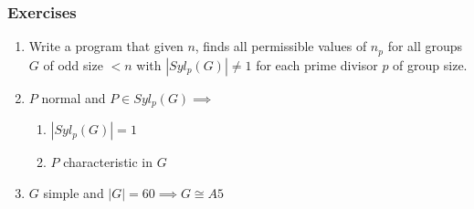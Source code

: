 \documentclass{beamer}
\begin{document}
\begin{frame}
    \frametitle{Exercises}
    \begin{enumerate}
    \item Write a program that given $n$, finds all permissible values of $n_p$
        for all groups $G$ of odd size $< n$ with $|Syl_p(G)|\neq 1$ for each
        prime divisor $p$ of group size.
        \item $P$ normal and $P\in Syl_p(G)\implies$
        \begin{enumerate}
            \item $|Syl_p(G)| = 1$
            \item $P$ characteristic in $G$
        \end{enumerate}
    \item $G$ simple and $|G| = 60\implies G\cong A5$
    \end{enumerate}
\end{frame}
\end{document}

